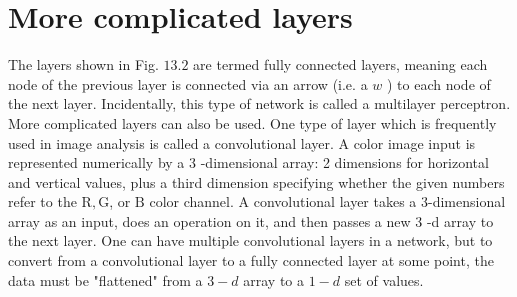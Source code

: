 \section*{More complicated layers}
The layers shown in Fig. $13.2$ are termed fully connected layers, meaning each node of the previous layer is connected via an arrow (i.e. a $w$ ) to each node of the next layer. Incidentally, this type of network is called a multilayer perceptron. More complicated layers can also be used. One type of layer which is frequently used in image analysis is called a convolutional layer. A color image input is represented numerically by a 3 -dimensional array: 2 dimensions for horizontal and vertical values, plus a third dimension specifying whether the given numbers refer to the $\mathrm{R}, \mathrm{G}$, or $\mathrm{B}$ color channel. A convolutional layer takes a 3-dimensional array as an input, does an operation on it, and then passes a new 3 -d array to the next layer. One can have multiple convolutional layers in a network, but to convert from a convolutional layer to a fully connected layer at some point, the data must be "flattened" from a $3-d$ array to a $1-d$ set of values.

